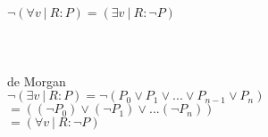 \documentclass[18pt,a4paper]{article}
\newcommand{\tab}{\hspace*{2em}}
\begin{document}
$\neg (\forall{v} \:\vert\: R : P) = (\exists{v} \:\vert\: R : \neg P)$\\
\\
\\
\\
de Morgan\\
$\neg (\exists{v} \:\vert\: R : P) = \neg (P_0 \vee P_1 \vee ... \vee P_{n-1} \vee P_n) $\\
\tab \tab \tab $= ((\neg P_0) \vee (\neg P_1) \vee ... (\neg P_n))$\\
\tab \tab \tab $= (\forall{v} \:\vert\: R : \neg P)$\\












%
%
\end{document}
